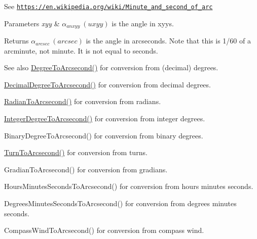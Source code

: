 See \href{https://en.wikipedia.org/wiki/Minute_and_second_of_arc}{\tt https\+://en.\+wikipedia.\+org/wiki/\+Minute\+\_\+and\+\_\+second\+\_\+of\+\_\+arc} 
\begin{DoxyParams}{Parameters}
{\em xyy} & $\alpha_{anxyy}\ (uxyy)$ is the angle in xyys. \\
\hline
\end{DoxyParams}
\begin{DoxyReturn}{Returns}
$\alpha_{arcsec}\ (arcsec)$ is the angle in arcseconds. Note that this is 1/60 of a arcminute, not minute. It is not equal to seconds. 
\end{DoxyReturn}
\begin{DoxySeeAlso}{See also}
\mbox{\hyperlink{group___e_g_x_math-_angle_conversions-_degree_gaf85e2d765c248f447854a807a68a5de8}{Degree\+To\+Arcsecond()}} for conversion from (decimal) degrees. 

\mbox{\hyperlink{group___e_g_x_math-_angle_conversions-_decimal_degree_gab9d5635a6e35127b5245978aba508962}{Decimal\+Degree\+To\+Arcsecond()}} for conversion from decimal degrees. 

\mbox{\hyperlink{group___e_g_x_math-_angle_conversions-_radian_ga2f952f6675a0fc54bf72bfe4e3d2664a}{Radian\+To\+Arcsecond()}} for conversion from radians. 

\mbox{\hyperlink{group___e_g_x_math-_angle_conversions-_integer_degree_gaa04058a2fea3dc3678264a05fac6e1ae}{Integer\+Degree\+To\+Arcsecond()}} for conversion from integer degrees. 

Binary\+Degree\+To\+Arcsecond() for conversion from binary degrees. 

\mbox{\hyperlink{group___e_g_x_math-_angle_conversions-_turn_gaad072969abc59ef6f5b63ac6a176a11b}{Turn\+To\+Arcsecond()}} for conversion from turns. 

Gradian\+To\+Arcsecond() for conversion from gradians. 

Hours\+Minutes\+Seconds\+To\+Arcsecond() for conversion from hours minutes seconds. 

Degrees\+Minutes\+Seconds\+To\+Arcsecond() for conversion from degrees minutes seconds. 

Compass\+Wind\+To\+Arcsecond() for conversion from compass wind. 
\end{DoxySeeAlso}
\mbox{\label{group___e_g_x_math-_angle_conversions-_x_z_x_ga245f7fe63a1fec3b66d44f5ad07abc72}} 

